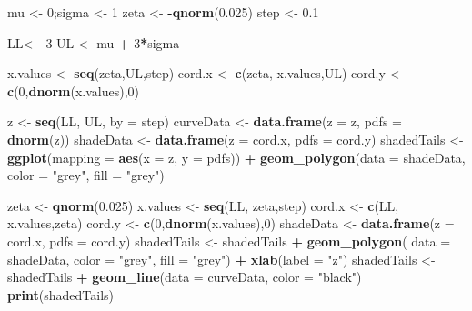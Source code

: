 \documentclass[
]{book}
\newenvironment{Shaded}{\begin{snugshade}}{\end{snugshade}}
\newcommand{\DataTypeTok}[1]{\textcolor[rgb]{0.13,0.29,0.53}{#1}}
\newcommand{\DecValTok}[1]{\textcolor[rgb]{0.00,0.00,0.81}{#1}}
\newcommand{\FloatTok}[1]{\textcolor[rgb]{0.00,0.00,0.81}{#1}}
\newcommand{\KeywordTok}[1]{\textcolor[rgb]{0.13,0.29,0.53}{\textbf{#1}}}
\newcommand{\NormalTok}[1]{#1}
\newcommand{\OperatorTok}[1]{\textcolor[rgb]{0.81,0.36,0.00}{\textbf{#1}}}
\newcommand{\StringTok}[1]{\textcolor[rgb]{0.31,0.60,0.02}{#1}}
\begin{document}
\begin{Shaded}
\begin{Highlighting}[]
\NormalTok{mu <-}\StringTok{ }\DecValTok{0}\NormalTok{;sigma <-}\StringTok{ }\DecValTok{1}
\NormalTok{zeta <-}\StringTok{ }\OperatorTok{-}\KeywordTok{qnorm}\NormalTok{(}\FloatTok{0.025}\NormalTok{)}
\NormalTok{step <-}\StringTok{ }\FloatTok{0.1}

\NormalTok{LL<-}\StringTok{ }\DecValTok{-3}
\NormalTok{UL <-}\StringTok{ }\NormalTok{mu }\OperatorTok{+}\StringTok{ }\DecValTok{3}\OperatorTok{*}\NormalTok{sigma}

\NormalTok{x.values <-}\StringTok{ }\KeywordTok{seq}\NormalTok{(zeta,UL,step)}
\NormalTok{cord.x <-}\StringTok{ }\KeywordTok{c}\NormalTok{(zeta, x.values,UL) }
\NormalTok{cord.y <-}\StringTok{ }\KeywordTok{c}\NormalTok{(}\DecValTok{0}\NormalTok{,}\KeywordTok{dnorm}\NormalTok{(x.values),}\DecValTok{0}\NormalTok{) }

\NormalTok{z <-}\StringTok{ }\KeywordTok{seq}\NormalTok{(LL, UL, }\DataTypeTok{by =}\NormalTok{ step)}
\NormalTok{curveData <-}\StringTok{ }\KeywordTok{data.frame}\NormalTok{(}\DataTypeTok{z =}\NormalTok{ z, }\DataTypeTok{pdfs =} \KeywordTok{dnorm}\NormalTok{(z))}
\NormalTok{shadeData <-}\StringTok{ }\KeywordTok{data.frame}\NormalTok{(}\DataTypeTok{z =}\NormalTok{ cord.x, }\DataTypeTok{pdfs =}\NormalTok{ cord.y)}
\NormalTok{shadedTails <-}\StringTok{ }\KeywordTok{ggplot}\NormalTok{(}\DataTypeTok{mapping =} \KeywordTok{aes}\NormalTok{(}\DataTypeTok{x =}\NormalTok{ z, }\DataTypeTok{y =}\NormalTok{ pdfs))  }\OperatorTok{+}\StringTok{ }
\StringTok{  }\KeywordTok{geom_polygon}\NormalTok{(}\DataTypeTok{data =}\NormalTok{ shadeData, }\DataTypeTok{color =} \StringTok{"grey"}\NormalTok{, }\DataTypeTok{fill =} \StringTok{"grey"}\NormalTok{)}

\NormalTok{zeta <-}\StringTok{ }\KeywordTok{qnorm}\NormalTok{(}\FloatTok{0.025}\NormalTok{)}
\NormalTok{x.values <-}\StringTok{ }\KeywordTok{seq}\NormalTok{(LL, zeta,step)}
\NormalTok{cord.x <-}\StringTok{ }\KeywordTok{c}\NormalTok{(LL, x.values,zeta) }
\NormalTok{cord.y <-}\StringTok{ }\KeywordTok{c}\NormalTok{(}\DecValTok{0}\NormalTok{,}\KeywordTok{dnorm}\NormalTok{(x.values),}\DecValTok{0}\NormalTok{) }
\NormalTok{shadeData <-}\StringTok{ }\KeywordTok{data.frame}\NormalTok{(}\DataTypeTok{z =}\NormalTok{ cord.x, }\DataTypeTok{pdfs =}\NormalTok{ cord.y)}
\NormalTok{shadedTails <-}\StringTok{ }\NormalTok{shadedTails }\OperatorTok{+}\StringTok{ }
\StringTok{  }\KeywordTok{geom_polygon}\NormalTok{(}
    \DataTypeTok{data =}\NormalTok{ shadeData, }\DataTypeTok{color =} \StringTok{"grey"}\NormalTok{, }\DataTypeTok{fill =} \StringTok{"grey"}\NormalTok{) }\OperatorTok{+}\StringTok{ }
\StringTok{  }\KeywordTok{xlab}\NormalTok{(}\DataTypeTok{label =} \StringTok{"z"}\NormalTok{) }
\NormalTok{shadedTails <-}\StringTok{ }\NormalTok{shadedTails }\OperatorTok{+}\StringTok{ }
\StringTok{  }\KeywordTok{geom_line}\NormalTok{(}\DataTypeTok{data =}\NormalTok{ curveData, }\DataTypeTok{color =} \StringTok{"black"}\NormalTok{)}
\KeywordTok{print}\NormalTok{(shadedTails)}
\end{Highlighting}
\end{Shaded}
\end{document}
